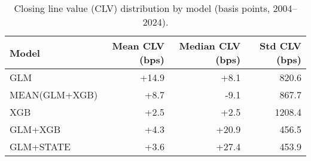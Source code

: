 \begin{table}[t]
  \centering
  \small
  \caption[CLV distribution by model]{Closing line value (CLV) distribution by model (basis points, 2004--2024).}
  \label{tab:clv-distribution}
  \setlength{\tabcolsep}{4pt}\renewcommand{\arraystretch}{1.12}
  \begin{tabular}{@{} l r r r @{} }
    \toprule
    \textbf{Model} & \textbf{Mean CLV (bps)} & \textbf{Median CLV (bps)} & \textbf{Std CLV (bps)} \\
    \midrule
    GLM & +14.9 & +8.1 & 820.6 \\
    MEAN(GLM+XGB) & +8.7 & -9.1 & 867.7 \\
    XGB & +2.5 & +2.5 & 1208.4 \\
    GLM+XGB & +4.3 & +20.9 & 456.5 \\
    GLM+STATE & +3.6 & +27.4 & 453.9 \\
    \bottomrule
  \end{tabular}
\end{table}

